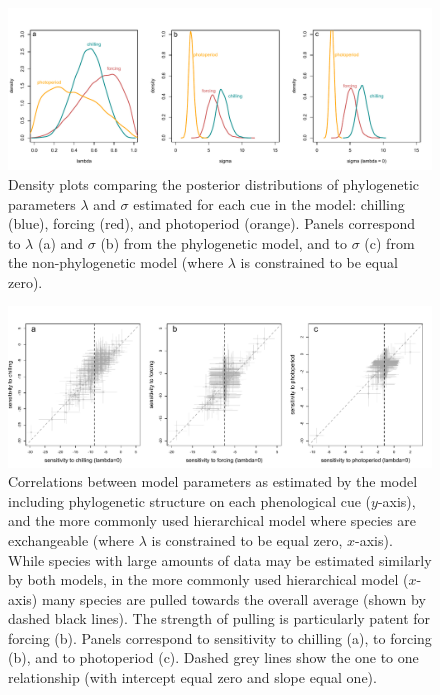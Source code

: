 \documentclass[11pt]{article}
\begin{document}
\clearpage

\begin{figure} [H]
  \begin{center}
  \includegraphics[width=14cm]{../../analyses/phylogeny/figures/Fig2_lambdas_sigmas.pdf}
  \caption{Density plots comparing the posterior distributions of phylogenetic parameters $\lambda$ and $\sigma$ estimated for each cue in the model: chilling (blue), forcing (red), and photoperiod (orange). Panels correspond to $\lambda$ (a) and $\sigma$ (b) from the phylogenetic model, and to $\sigma$ (c) from the non-phylogenetic model (where $\lambda$ is constrained to be equal zero).}
  \label{fig:phylosig_all}
  \end{center}
\end{figure}

\begin{figure} [H]
  \begin{center}
  \includegraphics[width=14cm]{../../analyses/phylogeny/figures/Fig3_correlations_lambestvslamb0.pdf}
  \caption{Correlations between model parameters as estimated by the model including phylogenetic structure on each phenological cue ($y$-axis), and the more commonly used hierarchical model where species are exchangeable (where $\lambda$ is constrained to be equal zero, $x$-axis). While species with large amounts of data may be estimated similarly by both models, in the more commonly used hierarchical model ($x$-axis) many species are pulled towards the overall average (shown by dashed black lines). The strength of pulling is particularly patent for forcing (b). Panels correspond to sensitivity to chilling (a), to forcing (b), and to photoperiod (c). Dashed grey lines show the one to one relationship (with intercept equal zero and slope equal one).}
  \label{fig:correls_angio}
  \end{center}
\end{figure}
\end{document}
